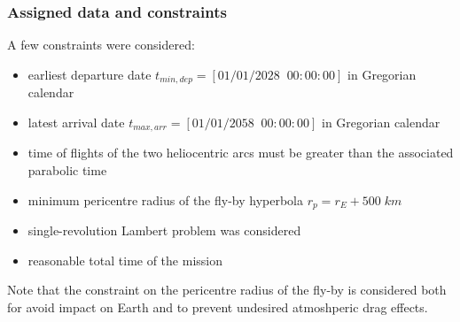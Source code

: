 \subsubsection{Assigned data and constraints}
\label{subsubsec:data_constraints}
A few constraints were considered:
\begin{itemize}
    [wide,itemsep=3pt,topsep=3pt]
    \item earliest departure date $t_{min,dep} = \left[01/01/2028 \;\; 00:00:00\right]$ in Gregorian calendar
    \item latest arrival date $t_{max,arr} = \left[01/01/2058 \;\; 00:00:00\right]$ in Gregorian calendar
    \item time of flights of the two heliocentric arcs must be greater than the associated parabolic time
    \item minimum pericentre radius of the fly-by hyperbola $r_p = r_E + 500 \; km$
    \item single-revolution Lambert problem was considered
    \item reasonable total time of the mission
\end{itemize}

Note that the constraint on the pericentre radius of the fly-by is considered both for avoid impact on Earth and to prevent undesired atmoshperic drag effects. 



